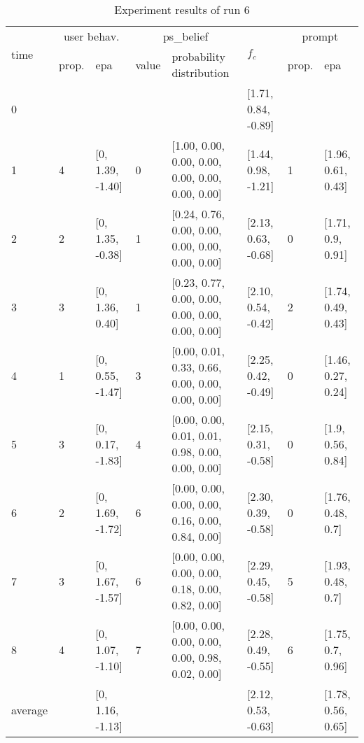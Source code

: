 \begin{table}[htbp]\footnotesize
\caption{Experiment results of run 6}
\begin{tabular}{|p{0.4cm}|p{0.6cm}|l|p{0.6cm}|p{3.3cm}|l|p{0.6cm}|l|}
\hline

\multirow{2}{*}{time} & \multicolumn{2}{c|}{user behav.} & \multicolumn{2}{c|}{ps\_belief} &
\multirow{2}{*}{$f_c$} & \multicolumn{2}{c|}{prompt} \\ \cline{2-5}\cline{ 7- 8}
& prop. & epa & value & probability distribution &  & prop. & epa \\ \hline

0 & \multicolumn{1}{l|}{} &  & \multicolumn{1}{l|}{} &  & [1.71, 0.84, -0.89] & \multicolumn{1}{l|}{} &  \\ \hline
1 & 4 & [0, 1.39, -1.40] & 0 & [1.00, 0.00, 0.00, 0.00, 0.00, 0.00, 0.00, 0.00] & [1.44, 0.98, -1.21] & 1 & [1.96, 0.61, 0.43] \\ \hline
2 & 2 & [0, 1.35, -0.38] & 1 & [0.24, 0.76, 0.00, 0.00, 0.00, 0.00, 0.00, 0.00] & [2.13, 0.63, -0.68] & 0 & [1.71, 0.9, 0.91] \\ \hline
3 & 3 & [0, 1.36, 0.40] & 1 & [0.23, 0.77, 0.00, 0.00, 0.00, 0.00, 0.00, 0.00] & [2.10, 0.54, -0.42] & 2 & [1.74, 0.49, 0.43] \\ \hline
4 & 1 & [0, 0.55, -1.47] & 3 & [0.00, 0.01, 0.33, 0.66, 0.00, 0.00, 0.00, 0.00] & [2.25, 0.42, -0.49] & 0 & [1.46, 0.27, 0.24] \\ \hline
5 & 3 & [0, 0.17, -1.83] & 4 & [0.00, 0.00, 0.01, 0.01, 0.98, 0.00, 0.00, 0.00] & [2.15, 0.31, -0.58] & 0 & [1.9, 0.56, 0.84] \\ \hline
6 & 2 & [0, 1.69, -1.72] & 6 & [0.00, 0.00, 0.00, 0.00, 0.16, 0.00, 0.84, 0.00] & [2.30, 0.39, -0.58] & 0 & [1.76, 0.48, 0.7] \\ \hline
7 & 3 & [0, 1.67, -1.57] & 6 & [0.00, 0.00, 0.00, 0.00, 0.18, 0.00, 0.82, 0.00] & [2.29, 0.45, -0.58] & 5 & [1.93, 0.48, 0.7] \\ \hline
8 & 4 & [0, 1.07, -1.10] & 7 & [0.00, 0.00, 0.00, 0.00, 0.00, 0.98, 0.02, 0.00] & [2.28, 0.49, -0.55] & 6 & [1.75, 0.7, 0.96] \\ \hline
\multicolumn{1}{|l|}{average} & \multicolumn{1}{l|}{} & [0, 1.16, -1.13] & \multicolumn{1}{l|}{} &  & [2.12, 0.53, -0.63] & \multicolumn{1}{l|}{} & [1.78, 0.56, 0.65] \\ \hline
\end{tabular}
\label{}
\end{table}


